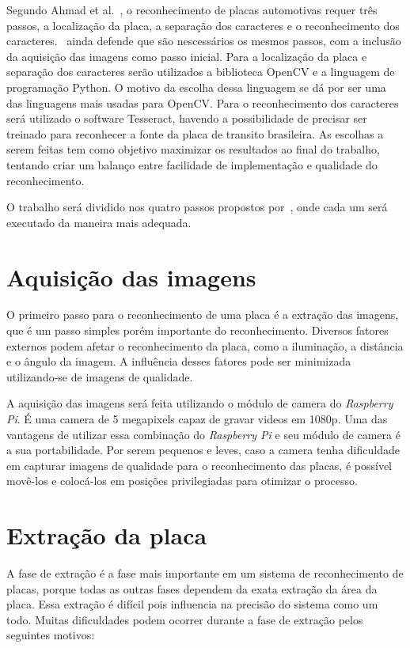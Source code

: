 Segundo Ahmad et al.~\cite{ahmad2015automatic}, o reconhecimento de placas
automotivas requer três passos, a localização da placa, a separação dos
caracteres e o reconhecimento dos caracteres.~\cite{s2013automatic} ainda
defende que são nescessários os mesmos passos, com a inclusão da aquisição das
imagens como passo inicial. Para a localização da placa e separação dos
caracteres serão utilizados a biblioteca OpenCV e a linguagem de programação
Python. O motivo da escolha dessa linguagem se dá por ser uma das linguagens
mais usadas para OpenCV\@. Para o reconhecimento dos caracteres será utilizado o
software Tesseract, havendo a possibilidade de precisar ser treinado para
reconhecer a fonte da placa de transito brasileira. As escolhas a serem feitas
tem como objetivo maximizar os resultados ao final do trabalho, tentando criar
um balanço entre facilidade de implementação e qualidade do reconhecimento.

O trabalho será dividido nos quatro passos propostos por~\cite{s2013automatic},
onde cada um será executado da maneira mais adequada.

\section{Aquisição das imagens}
\label{sec:aquisicao}

O primeiro passo para o reconhecimento de uma placa é a extração das imagens,
que é um passo simples porém importante do reconhecimento. Diversos fatores
externos podem afetar o reconhecimento da placa, como a iluminação, a distância
e o ângulo da imagem. A influência desses fatores pode ser minimizada
utilizando-se de imagens de qualidade.

A aquisição das imagens será feita utilizando o módulo de camera do
\emph{Raspberry Pi}. É uma camera de 5 megapixels capaz de gravar videos em
1080p. Uma das vantagens de utilizar essa combinação do \emph{Raspberry Pi} e
seu módulo de camera é a sua portabilidade. Por serem pequenos e leves, caso a
camera tenha dificuldade em capturar imagens de qualidade para o reconhecimento
das placas, é possível movê-los e colocá-los em posições privilegiadas para
otimizar o processo.

\section{Extração da placa}
\label{sec:extracao}

A fase de extração é a fase mais importante em um sistema de reconhecimento de
placas, porque todas as outras fases dependem da exata extração da área da
placa. Essa extração é difícil pois influencia na precisão do sistema como um
todo. Muitas dificuldades podem ocorrer durante a fase de extração pelos
seguintes motivos:

